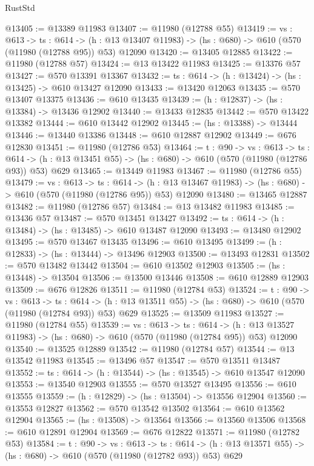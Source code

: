 \begin{lexlean}{RustStd}
\begin{coremodule}
@13405 := @13389 @11983
@13407 := @11980 (@12788 @55)
@13419 := {vs : @613} ->
  {ts : @614} ->
  (h : @13 @13407 @11983) -> (hs : @680) -> @610 (@570 (@11980 (@12788 @95)) @53) @12090
@13420 := @13405 @12885
@13422 := @11980 (@12788 @57)
@13424 := @13 @13422 @11983
@13425 := @13376 @57
@13427 := @570 @13391 @13367
@13432 := {ts : @614} -> (h : @13424) -> (hs : @13425) -> @610 @13427 @12090
@13433 := @13420 @12063
@13435 := @570 @13407 @13375
@13436 := @610 @13435
@13439 := (h : @12837) -> (hs : @13384) -> @13436 @12902
@13440 := @13433 @12835
@13442 := @570 @13422 @13382
@13444 := @610 @13442 @12902
@13445 := (hs : @13388) -> @13444
@13446 := @13440 @13386
@13448 := @610 @12887 @12902
@13449 := @676 @12830
@13451 := @11980 (@12786 @53)
@13464 := {t : @90} ->
  {vs : @613} ->
  {ts : @614} -> (h : @13 @13451 @55) -> (hs : @680) -> @610 (@570 (@11980 (@12786 @93)) @53) @629
@13465 := @13449 @11983
@13467 := @11980 (@12786 @55)
@13479 := {vs : @613} ->
  {ts : @614} ->
  (h : @13 @13467 @11983) -> (hs : @680) -> @610 (@570 (@11980 (@12786 @95)) @53) @12090
@13480 := @13465 @12887
@13482 := @11980 (@12786 @57)
@13484 := @13 @13482 @11983
@13485 := @13436 @57
@13487 := @570 @13451 @13427
@13492 := {ts : @614} -> (h : @13484) -> (hs : @13485) -> @610 @13487 @12090
@13493 := @13480 @12902
@13495 := @570 @13467 @13435
@13496 := @610 @13495
@13499 := (h : @12833) -> (hs : @13444) -> @13496 @12903
@13500 := @13493 @12831
@13502 := @570 @13482 @13442
@13504 := @610 @13502 @12903
@13505 := (hs : @13448) -> @13504
@13506 := @13500 @13446
@13508 := @610 @12889 @12903
@13509 := @676 @12826
@13511 := @11980 (@12784 @53)
@13524 := {t : @90} ->
  {vs : @613} ->
  {ts : @614} -> (h : @13 @13511 @55) -> (hs : @680) -> @610 (@570 (@11980 (@12784 @93)) @53) @629
@13525 := @13509 @11983
@13527 := @11980 (@12784 @55)
@13539 := {vs : @613} ->
  {ts : @614} ->
  (h : @13 @13527 @11983) -> (hs : @680) -> @610 (@570 (@11980 (@12784 @95)) @53) @12090
@13540 := @13525 @12889
@13542 := @11980 (@12784 @57)
@13544 := @13 @13542 @11983
@13545 := @13496 @57
@13547 := @570 @13511 @13487
@13552 := {ts : @614} -> (h : @13544) -> (hs : @13545) -> @610 @13547 @12090
@13553 := @13540 @12903
@13555 := @570 @13527 @13495
@13556 := @610 @13555
@13559 := (h : @12829) -> (hs : @13504) -> @13556 @12904
@13560 := @13553 @12827
@13562 := @570 @13542 @13502
@13564 := @610 @13562 @12904
@13565 := (hs : @13508) -> @13564
@13566 := @13560 @13506
@13568 := @610 @12891 @12904
@13569 := @676 @12822
@13571 := @11980 (@12782 @53)
@13584 := {t : @90} ->
  {vs : @613} ->
  {ts : @614} -> (h : @13 @13571 @55) -> (hs : @680) -> @610 (@570 (@11980 (@12782 @93)) @53) @629

\end{coremodule}
\end{lexlean}
